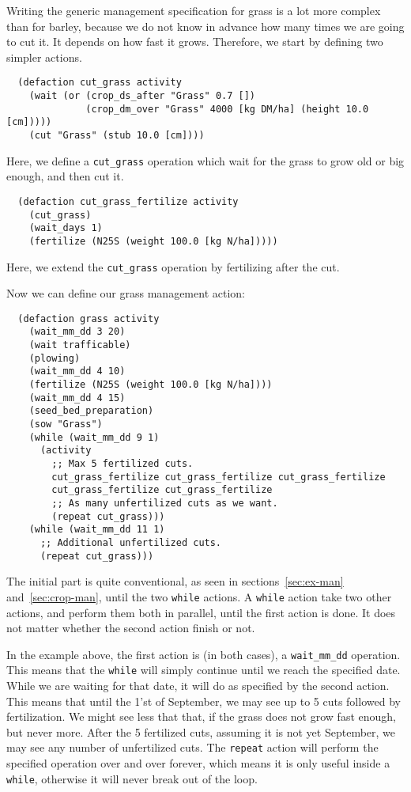 \documentclass[a4paper]{article}
\begin{document}
Writing the generic management specification for grass is a lot more
complex than for barley, because we do not know in advance how many
times we are going to cut it.  It depends on how fast it grows.
Therefore, we start by defining two simpler actions.
\begin{verbatim}
  (defaction cut_grass activity
    (wait (or (crop_ds_after "Grass" 0.7 [])
              (crop_dm_over "Grass" 4000 [kg DM/ha] (height 10.0 [cm]))))
    (cut "Grass" (stub 10.0 [cm])))
\end{verbatim}
Here, we define a \texttt{cut\_grass} operation which wait for the
grass to grow old or big enough, and then cut it.

\begin{verbatim}
  (defaction cut_grass_fertilize activity
    (cut_grass)
    (wait_days 1)
    (fertilize (N25S (weight 100.0 [kg N/ha]))))
\end{verbatim}
Here, we extend the \texttt{cut\_grass} operation by fertilizing after
the cut.

Now we can define our grass management action:
\begin{verbatim}
  (defaction grass activity
    (wait_mm_dd 3 20)
    (wait trafficable)
    (plowing)
    (wait_mm_dd 4 10)
    (fertilize (N25S (weight 100.0 [kg N/ha])))
    (wait_mm_dd 4 15)
    (seed_bed_preparation)
    (sow "Grass")
    (while (wait_mm_dd 9 1)
      (activity
        ;; Max 5 fertilized cuts.
        cut_grass_fertilize cut_grass_fertilize cut_grass_fertilize
        cut_grass_fertilize cut_grass_fertilize
        ;; As many unfertilized cuts as we want.
        (repeat cut_grass)))
    (while (wait_mm_dd 11 1)
      ;; Additional unfertilized cuts.
      (repeat cut_grass)))
\end{verbatim}
The initial part is quite conventional, as seen in
sections~\ref{sec:ex-man} and~\ref{sec:crop-man}, until the two
\texttt{while} actions.  A \texttt{while} action take two other
actions, and perform them both in parallel, until the first action is
done.  It does not matter whether the second action finish or not.

In the example above, the first action is (in both cases), a
\texttt{wait\_mm\_dd} operation.  This means that the \texttt{while}
will simply continue until we reach the specified date.  While we are
waiting for that date, it will do as specified by the second action.
This means that until the 1'st of September, we may see up to 5 cuts
followed by fertilization.  We might see less that that, if the grass
does not grow fast enough, but never more.  After the 5 fertilized
cuts, assuming it is not yet September, we may see any number of
unfertilized cuts.  The \texttt{repeat} action will perform the
specified operation over and over forever, which means it is only
useful inside a \texttt{while}, otherwise it will never break out of
the loop.
\end{document}
